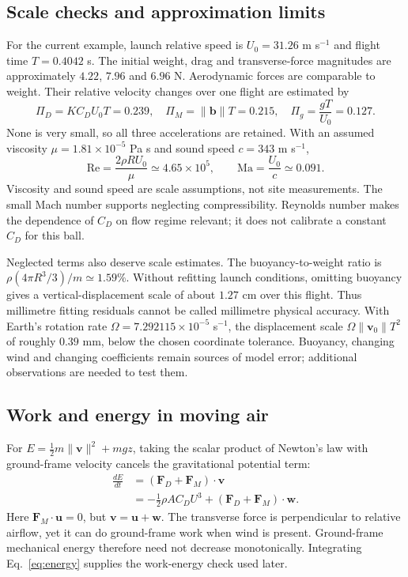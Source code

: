\documentclass[11pt,a4paper]{article}
\begin{document}
\subsection{Scale checks and approximation limits}
For the current example, launch relative speed is $U_0=31.26$ m s$^{-1}$ and flight time $T=0.4042$ s. The initial weight, drag and transverse-force magnitudes are approximately $4.22$, $7.96$ and $6.96$ N. Aerodynamic forces are comparable to weight. Their relative velocity changes over one flight are estimated by
\begin{equation}
\Pi_D=KC_DU_0T=0.239,\quad\Pi_M=\|\mathbf b\|T=0.215,\quad
\Pi_g=\frac{gT}{U_0}=0.127.
\end{equation}
None is very small, so all three accelerations are retained. With an assumed viscosity $\mu=1.81\times10^{-5}$ Pa s and sound speed $c=343$ m s$^{-1}$,
\begin{equation}
\mathrm{Re}=\frac{2\rho RU_0}{\mu}\simeq4.65\times 10^{5},\qquad\mathrm{Ma}=\frac{U_0}{c}\simeq0.091.
\end{equation}
Viscosity and sound speed are scale assumptions, not site measurements. The small Mach number supports neglecting compressibility. Reynolds number makes the dependence of $C_D$ on flow regime relevant; it does not calibrate a constant $C_D$ for this ball.

Neglected terms also deserve scale estimates. The buoyancy-to-weight ratio is $\rho(4\pi R^3/3)/m\simeq1.59\%$. Without refitting launch conditions, omitting buoyancy gives a vertical-displacement scale of about $1.27$ cm over this flight. Thus millimetre fitting residuals cannot be called millimetre physical accuracy. With Earth's rotation rate $\Omega=7.292115\times10^{-5}$ s$^{-1}$, the displacement scale $\Omega\|\mathbf v_0\|T^2$ of roughly $0.39$ mm, below the chosen coordinate tolerance. Buoyancy, changing wind and changing coefficients remain sources of model error; additional observations are needed to test them.
\subsection{Work and energy in moving air}
For $E=\tfrac12m\|\mathbf v\|^2+mgz$, taking the scalar product of Newton's law with ground-frame velocity cancels the gravitational potential term:
\begin{align}
\frac{dE}{dt}&=(\mathbf F_D+\mathbf F_M)\cdot\mathbf v\label{eq:energy}\\
&=-\tfrac12\rho AC_DU^3+(\mathbf F_D+\mathbf F_M)\cdot\mathbf w.\nonumber
\end{align}
Here $\mathbf F_M\cdot\mathbf u=0$, but $\mathbf v=\mathbf u+\mathbf w$. The transverse force is perpendicular to relative airflow, yet it can do ground-frame work when wind is present. Ground-frame mechanical energy therefore need not decrease monotonically. Integrating Eq.~\eqref{eq:energy} supplies the work-energy check used later.
\end{document}
